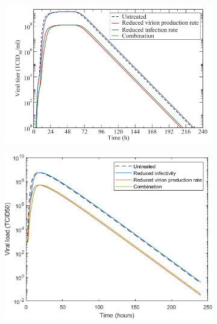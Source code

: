 \documentclass[a4paper,11pt]{article}
\begin{document}
\begin{figure}[ht]
    \centering
    \begin{subfigure}{0.4\textwidth}

    \includegraphics[width=\textwidth]{treatm10.png}
    \end{subfigure}
    \begin{subfigure}{0.35\textwidth}

    \includegraphics[width=\textwidth]{treat10.png}
    \end{subfigure}

    \begin{subfigure}{0.4\textwidth}


\end{subfigure}
\end{figure}
\end{document}

